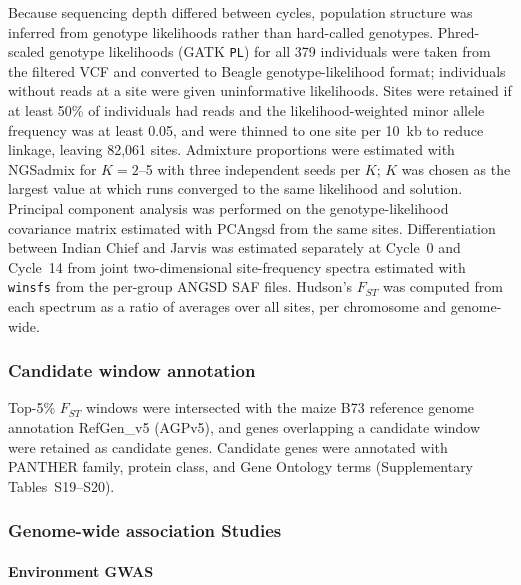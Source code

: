Because sequencing depth differed between cycles, population structure was inferred from genotype likelihoods rather than hard-called genotypes. Phred-scaled genotype likelihoods (GATK \texttt{PL}) for all 379 individuals were taken from the filtered VCF and converted to Beagle genotype-likelihood format; individuals without reads at a site were given uninformative likelihoods. Sites were retained if at least 50\% of individuals had reads and the likelihood-weighted minor allele frequency was at least 0.05, and were thinned to one site per 10~kb to reduce linkage, leaving 82,061 sites. Admixture proportions were estimated with NGSadmix \citep{Skotte2013NGSadmix} for $K = 2$--5 with three independent seeds per $K$; $K$ was chosen as the largest value at which runs converged to the same likelihood and solution. Principal component analysis was performed on the genotype-likelihood covariance matrix estimated with PCAngsd \citep{Meisner2018PCAngsd} from the same sites. Differentiation between Indian Chief and Jarvis was estimated separately at Cycle~0 and Cycle~14 from joint two-dimensional site-frequency spectra estimated with \texttt{winsfs} \citep{Rasmussen2022winsfs} from the per-group ANGSD SAF files. Hudson's $F_{ST}$ \citep{Bhatia2013Fst} was computed from each spectrum as a ratio of averages over all sites, per chromosome and genome-wide.

\subsubsection{Candidate window annotation}

Top-5\% $F_{ST}$ windows were intersected with the maize B73 reference genome annotation RefGen\_v5 (AGPv5), and genes overlapping a candidate window were retained as candidate genes. Candidate genes were annotated with PANTHER family, protein class, and Gene Ontology terms (Supplementary Tables~S19--S20).

\subsubsection{Genome-wide association Studies}

\paragraph{Environment GWAS}


